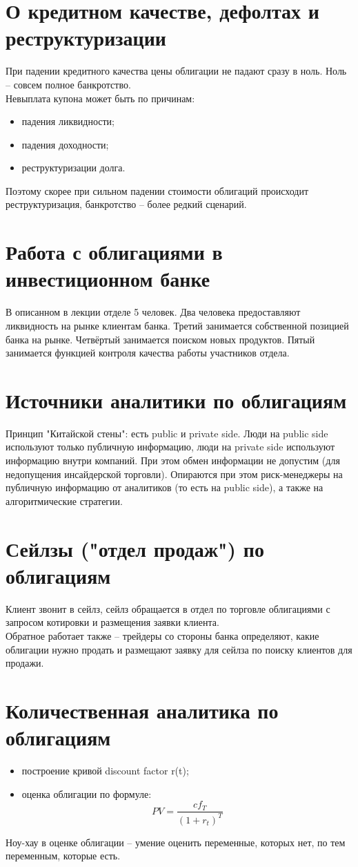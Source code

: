 \documentclass{article}
\begin{document}
\section{О кредитном качестве, дефолтах и реструктуризации}
При падении кредитного качества цены облигации не падают сразу в ноль. Ноль -- совсем полное банкротство.\\
Невыплата купона может быть по причинам:
\begin{itemize}
    \item падения ликвидности;
    \item падения доходности;
    \item реструктуризации долга.
\end{itemize}
Поэтому скорее при сильном падении стоимости облигаций происходит реструктуризация, банкротство -- более редкий сценарий.
\section{Работа с облигациями в инвестиционном банке}
В описанном в лекции отделе 5 человек. Два человека предоставляют ликвидность на рынке клиентам банка. Третий занимается собственной позицией банка на рынке. Четвёртый занимается поиском новых продуктов. Пятый занимается функцией контроля качества работы участников отдела.
\section{Источники аналитики по облигациям}
Принцип "Китайской стены": есть public и private side. Люди на public side используют только публичную информацию, люди на private side используют информацию внутри компаний. При этом обмен информации не допустим (для недопущения инсайдерской торговли). Опираются при этом риск-менеджеры на публичную информацию от аналитиков (то есть на public side), а также на алгоритмические стратегии.
\section{Сейлзы ("отдел продаж") по облигациям}
Клиент звонит в сейлз, сейлз обращается в отдел по торговле облигациями с запросом котировки и размещения заявки клиента.\\
Обратное работает также -- трейдеры со стороны банка определяют, какие облигации нужно продать и размещают заявку для сейлза по поиску клиентов для продажи.
\section{Количественная аналитика по облигациям}
\begin{itemize}
    \item построение кривой discount factor r(t);
    \item оценка облигации по формуле:
    \[PV = \frac{cf_T}{(1+r_t)^T}\]
\end{itemize}
Ноу-хау в оценке облигации -- умение оценить переменные, которых нет, по тем переменным, которые есть.
\end{document}
